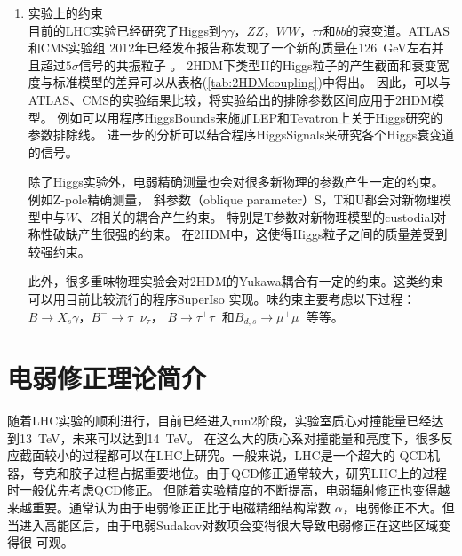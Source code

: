 \begin{enumerate}
\begin{itemize}
\item 幺正性\\
我们都知道，在标准模型中横向$W$玻色子散射过程如$W^+W^-\to W^+W^-$只有在包含Higgs粒子传播子的图后才能
保证该过程的幺正性。由于2HDM下的Higgs耦合与标准模型不同，要求Higgs-Higgs，Higgs-$V_L$散射的S矩阵的本征
值小于$16\pi$\cite{Ginzburg:unitarity}。

\end{itemize}

\item 实验上的约束 \\
目前的LHC实验已经研究了Higgs到$\gamma\gamma$，$ZZ$，$WW$，$\tau\tau$和$bb$的衰变道。ATLAS和CMS实验组
2012年已经发布报告称发现了一个新的质量在126~GeV左右并且超过$5\sigma$信号的共振粒子
\cite{ATLAS-2012,CMS-2012,ATLAS:01,ATLAS:02,ATLAS:03,ATLAS:04,ATLAS:05,ATLAS:06,CMS:01}。
2HDM下类型II的Higgs粒子的产生截面和衰变宽度与标准模型的差异可以从表格(\ref{tab:2HDMcoupling})中得出。
因此，可以与ATLAS、CMS的实验结果比较，将实验给出的排除参数区间应用于2HDM模型。
例如可以用程序HiggsBounds\cite{HiggsBounds:1,HiggsBounds:2}来施加LEP和Tevatron上关于Higgs研究的
参数排除线\cite{LEP:01,LEP:02,LEP:03}。
进一步的分析可以结合程序HiggsSignals\cite{HiggsSignal}来研究各个Higgs衰变道的信号。

除了Higgs实验外，电弱精确测量也会对很多新物理的参数产生一定的约束。例如Z-pole精确测量， 
斜参数（oblique parameter）S，T和U都会对新物理模型中与$W$、$Z$相关的耦合产生约束\cite{Peskin:01}。
特别是T参数对新物理模型的custodial对称性破缺产生很强的约束。
在2HDM中，这使得Higgs粒子之间的质量差受到较强约束\cite{pdg2014}。

此外，很多重味物理实验会对2HDM的Yukawa耦合有一定的约束。这类约束可以用目前比较流行的程序SuperIso
\cite{SuperIso}实现。味约束主要考虑以下过程：$B\to X_s \gamma$，$B^-\to \tau^- \bar{\nu}_{\tau}$，
$B\to \tau^+\tau^-$和$B_{d,s}\to \mu^+ \mu^-$等等\cite{F:01,F:02,F:03,F:04,F:05,F:06}。
\end{enumerate}

\section{电弱修正理论简介}
随着LHC实验的顺利进行，目前已经进入run2阶段，实验室质心对撞能量已经达到13~TeV，未来可以达到14~TeV。
在这么大的质心系对撞能量和亮度下，很多反应截面较小的过程都可以在LHC上研究。一般来说，LHC是一个超大的
QCD机器，夸克和胶子过程占据重要地位。由于QCD修正通常较大，研究LHC上的过程时一般优先考虑QCD修正。
但随着实验精度的不断提高，电弱辐射修正也变得越来越重要。通常认为由于电弱修正正比于电磁精细结构常数
$\alpha$，电弱修正不大。但当进入高能区后，由于电弱Sudakov对数项会变得很大导致电弱修正在这些区域变得很
可观。

